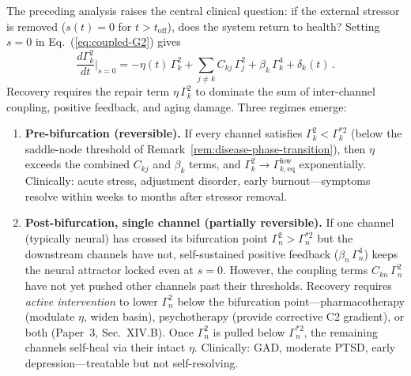 \documentclass[aps,pre,twocolumn,superscriptaddress,floatfix]{revtex4-2}
\begin{document}
The preceding analysis raises the central clinical
question: if the external stressor is removed
($s(t) = 0$ for $t > t_{\text{off}}$),
does the system return to health?
Setting $s = 0$ in Eq.~(\ref{eq:coupled-G2}) gives
\begin{equation}
  \frac{d\Gamma_k^2}{dt}\bigg|_{s=0}
  = -\eta(t)\,\Gamma_k^2
    + \sum_{j \neq k} C_{kj}\,\Gamma_j^2
    + \beta_k\,\Gamma_k^4
    + \delta_k(t)\,.
  \label{eq:recovery}
\end{equation}
Recovery requires the repair term
$\eta\,\Gamma_k^2$ to dominate the sum of
inter-channel coupling, positive feedback, and
aging damage.
Three regimes emerge:

\begin{enumerate}
  \item \textbf{Pre-bifurcation (reversible).}
    If every channel satisfies
    $\Gamma_k^2 < \Gamma_k^{*2}$
    (below the saddle-node threshold of
    Remark~\ref{rem:disease-phase-transition}),
    then $\eta$ exceeds the combined
    $C_{kj}$ and $\beta_k$ terms, and
    $\Gamma_k^2 \to \Gamma_{k,\text{eq}}^{\text{low}}$
    exponentially.
    Clinically: acute stress, adjustment disorder,
    early burnout---symptoms resolve within weeks
    to months after stressor removal.

  \item \textbf{Post-bifurcation, single channel
    (partially reversible).}
    If one channel (typically neural) has crossed
    its bifurcation point
    $\Gamma_n^2 > \Gamma_n^{*2}$
    but the downstream channels have not,
    self-sustained positive feedback
    ($\beta_n\,\Gamma_n^4$) keeps the neural
    attractor locked even at $s = 0$.
    However, the coupling terms
    $C_{kn}\,\Gamma_n^2$ have not yet pushed
    other channels past their thresholds.
    Recovery requires \emph{active intervention}
    to lower $\Gamma_n^2$ below the
    bifurcation point---pharmacotherapy
    (modulate $\eta$, widen basin),
    psychotherapy (provide corrective C2
    gradient), or both
    (Paper~3, Sec.~XIV.B).
    Once $\Gamma_n^2$ is pulled below
    $\Gamma_n^{*2}$, the remaining channels
    self-heal via their intact $\eta$.
    Clinically: GAD, moderate PTSD, early
    depression---treatable but not
    self-resolving.


\end{enumerate}
\end{document}
